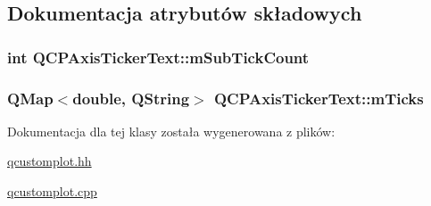 \subsection{Dokumentacja atrybutów składowych}
\subsubsection[{\texorpdfstring{m\+Sub\+Tick\+Count}{mSubTickCount}}]{\setlength{\rightskip}{0pt plus 5cm}int Q\+C\+P\+Axis\+Ticker\+Text\+::m\+Sub\+Tick\+Count\hspace{0.3cm}{\ttfamily [protected]}}\hypertarget{class_q_c_p_axis_ticker_text_a206d092b1598eecb981bba7fb16ff44e}{}\label{class_q_c_p_axis_ticker_text_a206d092b1598eecb981bba7fb16ff44e}
\subsubsection[{\texorpdfstring{m\+Ticks}{mTicks}}]{\setlength{\rightskip}{0pt plus 5cm}Q\+Map$<$double, Q\+String$>$ Q\+C\+P\+Axis\+Ticker\+Text\+::m\+Ticks\hspace{0.3cm}{\ttfamily [protected]}}\hypertarget{class_q_c_p_axis_ticker_text_a27c48539feb6c293979cd8059ba220c3}{}\label{class_q_c_p_axis_ticker_text_a27c48539feb6c293979cd8059ba220c3}


Dokumentacja dla tej klasy została wygenerowana z plików\+:\begin{DoxyCompactItemize}
\item 
\hyperlink{qcustomplot_8hh}{qcustomplot.\+hh}\item 
\hyperlink{qcustomplot_8cpp}{qcustomplot.\+cpp}\end{DoxyCompactItemize}
